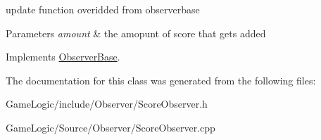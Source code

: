 update function overidded from observerbase 
\begin{DoxyParams}{Parameters}
{\em amount} & the amopunt of score that gets added \\
\hline
\end{DoxyParams}


Implements \hyperlink{classObserverBase}{Observer\+Base}.



The documentation for this class was generated from the following files\+:\begin{DoxyCompactItemize}
\item 
Game\+Logic/include/\+Observer/Score\+Observer.\+h\item 
Game\+Logic/\+Source/\+Observer/Score\+Observer.\+cpp\end{DoxyCompactItemize}
